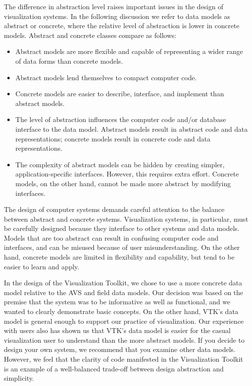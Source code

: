 The difference in abstraction level raises important issues in the design of visualization systems. In the following discussion we refer to data models as abstract or concrete, where the relative level of abstraction is lower in concrete models. Abstract and concrete classes compare as follows:

\begin{itemize}

	\item Abstract models are more flexible and capable of representing a wider range of data forms than concrete models.

	\item Abstract models lend themselves to compact computer code.

	\item Concrete models are easier to describe, interface, and implement than abstract models.

	\item The level of abstraction influences the computer code and/or database interface to the data model. Abstract models result in abstract code and data representations; concrete models result in concrete code and data representations.

	\item The complexity of abstract models can be hidden by creating simpler, application-specific interfaces. However, this requires extra effort. Concrete models, on the other hand, cannot be made more abstract by modifying interfaces.

\end{itemize}

The design of computer systems demands careful attention to the balance between abstract and concrete systems. Visualization systems, in particular, must be carefully designed because they interface to other systems and data models. Models that are too abstract can result in confusing computer code and interfaces, and can be misused because of user misunderstanding. On the other hand, concrete models are limited in flexibility and capability, but tend to be easier to learn and apply.

In the design of the Visualization Toolkit, we chose to use a more concrete data model relative to the AVS and field data models. Our decision was based on the premise that the system was to be informative as well as functional, and we wanted to clearly demonstrate basic concepts. On the other hand, VTK’s data model is general enough to support our practice of visualization. Our experience with users also has shown us that VTK’s data model is easier for the casual visualization user to understand than the more abstract models. If you decide to design your own system, we recommend that you examine other data models. However, we feel that the clarity of code manifested in the Visualization Toolkit is an example of a well-balanced trade-off between design abstraction and simplicity.

